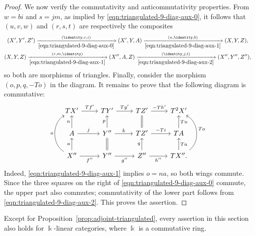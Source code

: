 \begin{proof}
	We now verify the commutativity and anticommutativity properties. From
	$w = bi$ and $s = jm$, as implied by
	\eqref{eqn:triangulated-9-diag-aux-0}, it follows that $(u, v, w)$ and
	$(r, s, t)$ are respectively the composites
	\begin{gather*}
		(X', Y', Z') \xrightarrow[\eqref{eqn:triangulated-9-diag-aux-0}]{(\identity, v, i)} (X', Y, A) \xrightarrow[\eqref{eqn:triangulated-9-diag-aux-1}]{(u, \identity, b)} (X, Y, Z), \\
		(X, Y, Z) \xrightarrow[\eqref{eqn:triangulated-9-diag-aux-1}]{(r, m, \identity)} (X'', A, Z) \xrightarrow[\eqref{eqn:triangulated-9-diag-aux-2}]{(\identity, j, t)} (X'', Y'', Z''),
	\end{gather*}
	so both are morphisms of triangles. Finally, consider the morphism
	$(o, p, q, -To)$ in the diagram. It remains to prove that the following
	diagram is commutative:
	\[\begin{tikzcd}
		TX' \arrow[r, "{Tf'}"] & TY' \arrow[r, "{Tg'}"] & TZ' \arrow[r, "{- Th'}"] & T^2 X' \\
		A \arrow[u, "n"] \arrow[r, "j"] & Y'' \arrow[r, "k"] \arrow[u, "p"] & TZ' \arrow[equal, u] \arrow[r, "-Ti"] & TA \arrow[u, "Tn"'] \\
		X'' \arrow[u, "a"] \arrow[r, "{f''}"'] \arrow[bend left=60, uu, "o"] & Y'' \arrow[r, "{g''}"'] \arrow[equal, u] & Z'' \arrow[r, "{h''}"'] \arrow[u, "q"] & TX'' \arrow[u, "Ta"'] \arrow[bend right=60, uu, "To"'] .
	\end{tikzcd}\]
	Indeed, \eqref{eqn:triangulated-9-diag-aux-1} implies $o = na$, so both
	wings commute. Since the three squares on the right of
	\eqref{eqn:triangulated-9-diag-aux-0} commute, the upper part also
	commutes; commutativity of the lower part follows from
	\eqref{eqn:triangulated-9-diag-aux-2}. This proves the assertion.
\end{proof}

Except for Proposition~\ref{prop:adjoint-triangulated}, every assertion in
this section also holds for $\Bbbk$-linear categories, where $\Bbbk$ is a
commutative ring.

